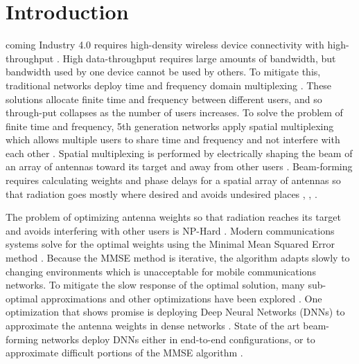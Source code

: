 \documentclass[journal]{IEEEtran}
\begin{document}
\section{Introduction}
 coming Industry 4.0 requires high-density wireless device connectivity with high-throughput \cite{Through_Max}. High data-throughput requires large amounts of bandwidth, but bandwidth used by one device cannot be used by others. To mitigate this, traditional networks deploy time and frequency domain multiplexing \cite{Through_Max}. These solutions allocate finite time and frequency between different users, and so through-put collapses as the number of users increases. To solve the problem of finite time and frequency, 5th generation networks apply spatial multiplexing which allows multiple users to share time and frequency and not interfere with each other \cite{Through_Max, Intelligent_mMMIMO}. Spatial multiplexing is performed by electrically shaping the beam of an array of antennas toward its target and away from other users \cite{Intelligent_mMMIMO}. Beam-forming requires calculating weights and phase delays for a spatial array of antennas so that radiation goes mostly where desired and avoids undesired places \cite{lu2020learningbased}, \cite{Review_DL_BF}, \cite{How_many_ant}.  

The problem of optimizing antenna weights so that radiation reaches its target and avoids interfering with other users is NP-Hard \cite{MMSE_Apps}. Modern communications systems solve for the optimal weights using the Minimal Mean Squared Error method \cite{MMSE_Apps}. Because the MMSE method is iterative, the algorithm adapts slowly to changing environments which is unacceptable for mobile communications networks. To mitigate the slow response of the optimal solution, many sub-optimal approximations and other optimizations have been explored \cite{Iteratively_MMSE}. One optimization that shows promise is deploying Deep Neural Networks (DNNs) to approximate the antenna weights in dense networks \cite{Review_DL_BF}. State of the art beam-forming networks deploy DNNs either in end-to-end configurations, or to approximate difficult portions of the MMSE algorithm \cite{Review_DL_BF}. 
\end{document}
